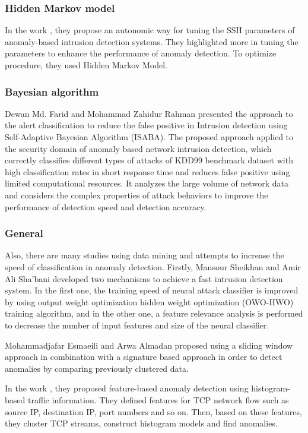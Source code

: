 \documentclass [11pt]{article}
\begin{document}
\subsubsection*{Hidden Markov model}
In the work \cite{sperotto2012autonomic}, they propose an autonomic way for tuning the SSH parameters of anomaly-based intrusion detection systems. They highlighted more in tuning the parameters to enhance the performance of anomaly detection. To optimize procedure, they used Hidden Markov Model.

\subsubsection*{Bayesian algorithm}
Dewan Md. Farid and Mohammad Zahidur Rahman \cite{dewan2011} presented the
approach to the alert classification to reduce the false positive in Intrusion detection
using Self-Adaptive Bayesian Algorithm (ISABA). The proposed approach applied to
the security domain of anomaly based network intrusion detection, which correctly
classifies different types of attacks of KDD99 benchmark dataset with high
classification rates in short response time and reduces false positive using limited
computational resources. It analyzes the large volume of network data and considers
the complex properties of attack behaviors to improve the performance of detection
speed and detection accuracy.

\subsubsection*{General}
Also, there are many studies using data mining and attempts to increase the speed of classification in anomaly detection. Firstly, Mansour Sheikhan and Amir Ali Sha'bani \cite{sheikhan2009fast} developed two mechanisms to achieve a fast intrusion detection system. In the first one, the training speed of neural attack classifier is improved by using output weight optimization hidden
weight optimization (OWO-HWO) training algorithm, and in the other one, a feature relevance analysis is performed to decrease the number of input features and size of the neural classifier.

Mohammadjafar Esmaeili and Arwa Almadan \cite{Esmaeili2011} proposed using a sliding window approach in combination with a signature based approach in order to detect anomalies by comparing previously clustered data.

In the work \cite{Kind2009}, they proposed feature-based anomaly detection using histogram-based traffic information. They defined features for TCP network flow such as source IP, destination IP, port numbers and so on. Then, based on these features, they cluster TCP streams, construct histogram models and find anomalies.
\end{document}
